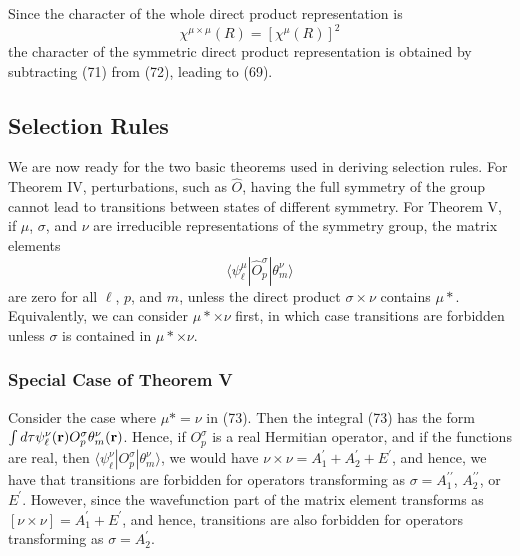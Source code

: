Since the character of the whole direct product representation is
\begin{equation}
\chi^{\mu \times \mu} (R) = \left[ \chi^{\mu} \left( R \right) 
\right]^2
\label{chap16-eqno72}
\end{equation}
the character of the symmetric direct product representation is 
obtained by subtracting (71) from (72), leading to (69).

\subsection{Selection Rules}

We are now ready for the two basic theorems used in deriving 
selection rules.  For Theorem IV, perturbations, such as ${\hat{O}}$, 
having the full symmetry of the group cannot lead to transitions 
between states of different symmetry.  For Theorem V, if $\mu$, 
$\sigma$, and $\nu$ are irreducible representations of the symmetry 
group, the matrix elements
\begin{equation}
\langle \psi^{\mu}_{\ell} | {\hat{O}}^{\sigma}_p | \theta^{\nu}_m 
\rangle
\label{chap16-eqno73}
\end{equation}
are zero for all $\ell$, $p$, and $m$, unless the direct product 
$\sigma \times \nu$ contains $\mu *$.  Equivalently, we can consider 
$\mu * \times \nu$ first, in which case transitions are forbidden 
unless $\sigma$ is contained in $\mu * \times \nu$.

\subsubsection{Special Case of Theorem V}

Consider the case where $\mu * = \nu$ in (73).  Then the integral 
(73) has the form $\int d \tau \psi^{\nu}_{\ell} ( {\bf r} ) 
O^{\sigma}_p \theta^{\nu}_m ( {\bf r} )$.  Hence, if $O^{\sigma}_p$ is 
a real Hermitian operator, and if the functions are real, then 
$\langle \psi^{\nu}_{\ell} | O^{\sigma}_p | \theta^{\nu}_m \rangle$, 
we would have $\nu \times \nu = A^{\prime}_1 + A^{\prime}_2 + 
E^{\prime}$, and hence, we have that transitions are forbidden for 
operators transforming as $\sigma = A^{\prime \prime}_1$, $A^{\prime 
\prime}_2$, or $E^{\prime}$.  However, since the wavefunction part of 
the matrix element transforms as $[ \nu \times \nu ] = A^{\prime}_1 + 
E^{\prime}$, and hence, transitions are also forbidden for operators 
transforming as $\sigma = A^{\prime}_2$.

